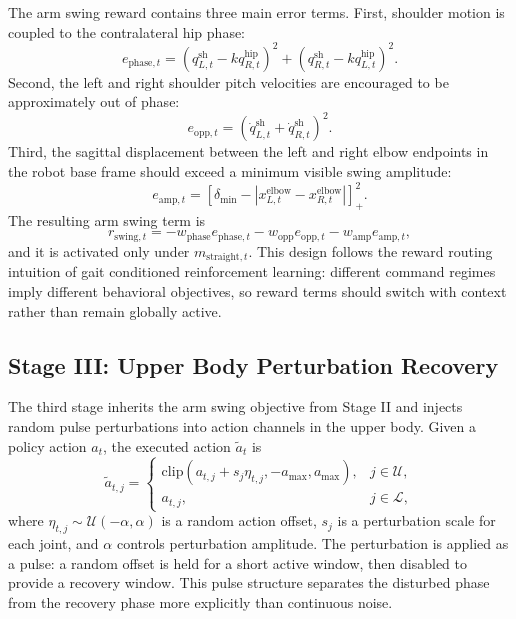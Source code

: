 \documentclass{article}
\newcommand{\relu}[1]{\left[#1\right]_+}
\begin{document}
The arm swing reward contains three main error terms. First, shoulder motion is coupled to the contralateral hip phase:
\begin{equation}
e_{\mathrm{phase},t}
=
\left(q_{L,t}^{\mathrm{sh}}-k q_{R,t}^{\mathrm{hip}}\right)^2
+
\left(q_{R,t}^{\mathrm{sh}}-k q_{L,t}^{\mathrm{hip}}\right)^2 .
\end{equation}
Second, the left and right shoulder pitch velocities are encouraged to be approximately out of phase:
\begin{equation}
e_{\mathrm{opp},t}
=
\left(\dot q_{L,t}^{\mathrm{sh}}+\dot q_{R,t}^{\mathrm{sh}}\right)^2 .
\end{equation}
Third, the sagittal displacement between the left and right elbow endpoints in the robot base frame should exceed a minimum visible swing amplitude:
\begin{equation}
e_{\mathrm{amp},t}
=
\relu{
\delta_{\min}
-
\left|x_{L,t}^{\mathrm{elbow}}-x_{R,t}^{\mathrm{elbow}}\right|
}^2 .
\end{equation}
The resulting arm swing term is
\begin{equation}
r_{\mathrm{swing},t}
=
-w_{\mathrm{phase}}e_{\mathrm{phase},t}
-w_{\mathrm{opp}}e_{\mathrm{opp},t}
-w_{\mathrm{amp}}e_{\mathrm{amp},t},
\end{equation}
and it is activated only under $m_{\mathrm{straight},t}$. This design follows the reward routing intuition of gait conditioned reinforcement learning: different command regimes imply different behavioral objectives, so reward terms should switch with context rather than remain globally active.

\subsection{Stage III: Upper Body Perturbation Recovery}

The third stage inherits the arm swing objective from Stage II and injects random pulse perturbations into action channels in the upper body. Given a policy action $a_t$, the executed action $\tilde a_t$ is
\begin{equation}
\tilde a_{t,j}=
\begin{cases}
\mathrm{clip}(a_{t,j}+s_j\eta_{t,j},-a_{\max},a_{\max}), & j\in\mathcal{U},\\
a_{t,j}, & j\in\mathcal{L},
\end{cases}
\end{equation}
where $\eta_{t,j}\sim\mathcal{U}(-\alpha,\alpha)$ is a random action offset, $s_j$ is a perturbation scale for each joint, and $\alpha$ controls perturbation amplitude. The perturbation is applied as a pulse: a random offset is held for a short active window, then disabled to provide a recovery window. This pulse structure separates the disturbed phase from the recovery phase more explicitly than continuous noise.
\end{document}

